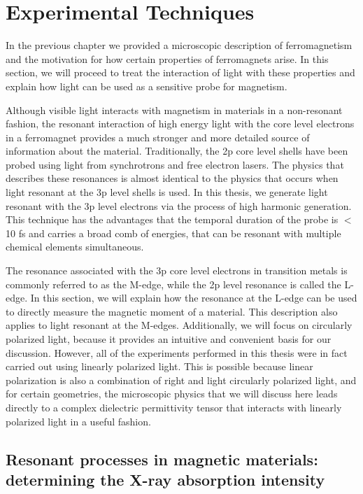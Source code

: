 \chapter{Experimental Techniques}

In the previous chapter we provided a microscopic description of ferromagnetism and the motivation for how certain properties of ferromagnets arise. In this section, we will proceed to treat the interaction of light with these properties and explain how light can be used as a sensitive probe for magnetism. 

Although visible light interacts with magnetism in materials in a non-resonant fashion, the resonant interaction of high energy light with the core level electrons in a ferromagnet provides a much stronger and more detailed source of information about the material. Traditionally, the 2p core level shells have been probed using light from synchrotrons and free electron lasers. The physics that describes these resonances is almost identical to the physics that occurs when light resonant at the 3p level shells is used. In this thesis, we generate light resonant with the 3p level electrons via the process of high harmonic generation. This technique has the advantages that the temporal duration of the probe is $<$ 10 fs and carries a broad comb of energies, that can be resonant with multiple chemical elements simultaneous. 

The resonance associated with the 3p core level electrons in transition metals is commonly referred to as the M-edge, while the 2p level resonance is called the L-edge. In this section, we will explain how the resonance at the L-edge can be used to directly measure the magnetic moment of a material. This description also applies to light resonant at the M-edges. Additionally, we will focus on circularly polarized light, because it provides an intuitive and convenient basis for our discussion. However, all of the experiments performed in this thesis were in fact carried out using linearly polarized light. This is possible because linear polarization is also a combination of right and light circularly polarized light, and for certain geometries, the microscopic physics that we will discuss here leads directly to a complex dielectric permittivity tensor that interacts with linearly polarized light in a useful fashion.

\section{Resonant processes in magnetic materials: determining the X-ray absorption intensity}

